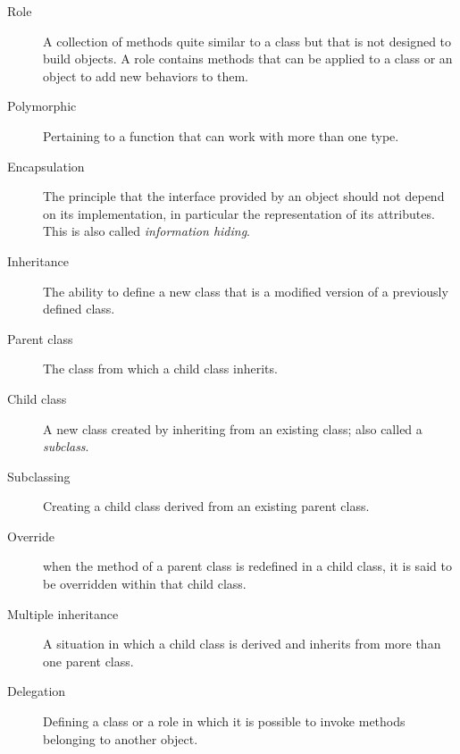 \begin{description}
\item[Role] A collection of methods quite similar to a class but 
that is not designed to build objects. A role contains methods 
that can be applied to a class or an object to add new behaviors 
to them.

\item[Polymorphic] Pertaining to a function that can work with more
  than one type.  

\item[Encapsulation] The principle that the interface provided 
by an object should not depend on its implementation, in particular
the representation of its attributes. This is also called 
\emph{information hiding}.

\item[Inheritance] The ability to define a new class that is a
modified version of a previously defined class.

\item[Parent class] The class from which a child class inherits.

\item[Child class] A new class created by inheriting from an
existing class; also called a \emph{subclass}.

\item[Subclassing] Creating a child class derived from an 
existing parent class.

\item[Override] when the method of a parent class is 
redefined in a child class, it is said to be overridden 
within that child class.

\item[Multiple inheritance] A situation in which a child class 
is derived and inherits from more than one parent class.

\item[Delegation] Defining a class or a role in which it is 
possible to invoke methods belonging to another object.

\end{description}

